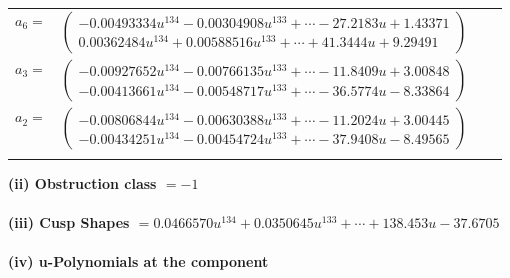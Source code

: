 \documentclass[1p]{elsarticle_modified}
\theoremstyle{definition}
\begin{document}
\begin{tabular}{m{7pt} m{180pt} m{7pt} m{180pt} }
\flushright $a_{6}=$&$\begin{pmatrix}-0.00493334 u^{134}-0.00304908 u^{133}+\cdots-27.2183 u+1.43371\\0.00362484 u^{134}+0.00588516 u^{133}+\cdots+41.3444 u+9.29491\end{pmatrix}$ \\
\flushright $a_{3}=$&$\begin{pmatrix}-0.00927652 u^{134}-0.00766135 u^{133}+\cdots-11.8409 u+3.00848\\-0.00413661 u^{134}-0.00548717 u^{133}+\cdots-36.5774 u-8.33864\end{pmatrix}$ \\
\flushright $a_{2}=$&$\begin{pmatrix}-0.00806844 u^{134}-0.00630388 u^{133}+\cdots-11.2024 u+3.00445\\-0.00434251 u^{134}-0.00454724 u^{133}+\cdots-37.9408 u-8.49565\end{pmatrix}$\\&\end{tabular}
\flushleft \textbf{(ii) Obstruction class $= -1$}\\~\\
\flushleft \textbf{(iii) Cusp Shapes $= 0.0466570 u^{134}+0.0350645 u^{133}+\cdots+138.453 u-37.6705$}\\~\\
\newpage\renewcommand{\arraystretch}{1}
\flushleft \textbf{(iv) u-Polynomials at the component}\newline \\
\end{document}
